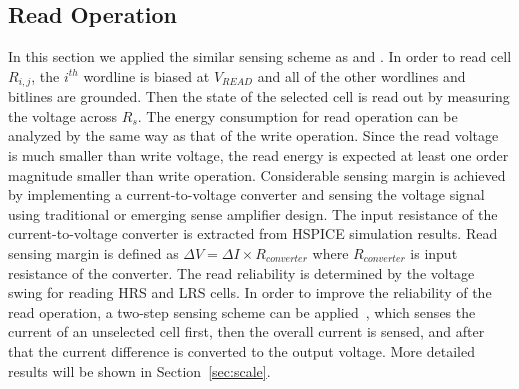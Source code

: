 \subsection{Read Operation}
In this section we applied the similar sensing scheme as
\cite{crossbar_TED_2010} and \cite{crossbar_NANO08_Flocke}. In order to
read cell $R_{i,j}$, the $i^{th}$ wordline is biased at $V_{READ}$ and all
of the other wordlines and bitlines are grounded. Then the state of the
selected cell is read out by measuring the voltage across $R_s$. The
energy consumption for read operation can be analyzed by the same way as
that of the write operation. Since the read voltage is much smaller than
write voltage, the read energy is expected at least one order magnitude
smaller than write operation. Considerable sensing margin is achieved by
implementing a current-to-voltage converter and sensing the voltage signal
using traditional or emerging sense amplifier design. The input resistance
of the current-to-voltage converter is extracted from HSPICE simulation
results. Read sensing margin is defined as $\Delta V = \Delta I \times
R_{converter}$ where $R_{converter}$ is input resistance of the converter.
The read reliability is determined by the voltage swing for reading HRS
and LRS cells. In order to improve the reliability of the read operation,
a two-step sensing scheme can be applied~\cite{memristor:Cong}, which
senses the current of an unselected cell first, then the overall current
is sensed, and after that the current difference is converted to the
output voltage. More detailed results will be shown in
Section~\ref{sec:scale}.




